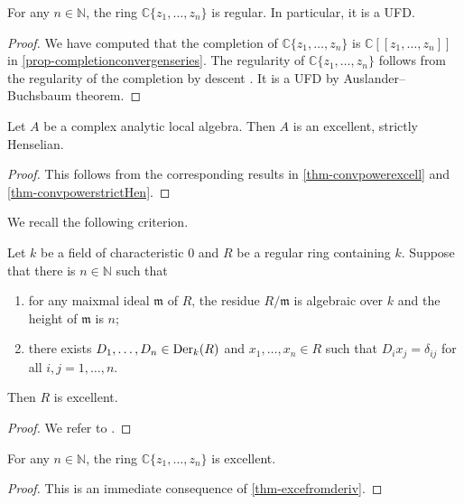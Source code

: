 \begin{thm}\label{thm-convpowerregular}
    For any $n\in \mathbb{N}$, the ring $\mathbb{C}\{ z_1,\ldots,z_n \}$ is regular. In particular, it is a UFD.
\end{thm}
\begin{proof}
    We have computed that the completion of $\mathbb{C}\{ z_1,\ldots,z_n \}$ is $\mathbb{C}[[ z_1,\ldots,z_n ]]$ in \cref{prop-completionconvergenseries}. The regularity of $\mathbb{C}\{ z_1,\ldots,z_n \}$ follows from the regularity of the completion by descent \cite[\href{https://stacks.math.columbia.edu/tag/07NY}{Tag 07NY}]{stacks-project}. It is a UFD by Auslander--Buchsbaum theorem.
\end{proof}
\begin{proposition}\label{prop-analocalgwellbehaved}
    Let $A$ be a complex analytic local algebra. Then $A$ is an excellent, strictly Henselian. 
\end{proposition}
\begin{proof}
    This follows from the corresponding results in \cref{thm-convpowerexcell} and \cref{thm-convpowerstrictHen}.
\end{proof}


We recall the following criterion.
\begin{thm}\label{thm-excefromderiv}
    Let $k$ be a field of characteristic $0$ and $R$ be a regular ring containing $k$. Suppose that there is $n\in \mathbb{N}$ such that
    \begin{enumerate}
        \item for any maixmal ideal $\mathfrak{m}$ of $R$, the residue $R/\mathfrak{m}$ is algebraic over $k$ and the height of $\mathfrak{m}$ is $n$;
        \item there exists $D_1,\ldots, D_n\in \operatorname{Der}_k(R)$ and $x_1,\ldots,x_n\in R$ such that $D_ix_j=\delta_{ij}$ for all $i,j=1,\ldots,n$. 
    \end{enumerate}
    Then $R$ is excellent.
\end{thm}
\begin{proof}
    We refer to \cite[Theorem~102]{Mat80}.
\end{proof}

\begin{thm}\label{thm-convpowerexcell}
    For any $n\in \mathbb{N}$, the ring $\mathbb{C}\{ z_1,\ldots,z_n \}$ is excellent.
\end{thm}
\begin{proof}
    This is an immediate consequence of \cref{thm-excefromderiv}.
\end{proof}

